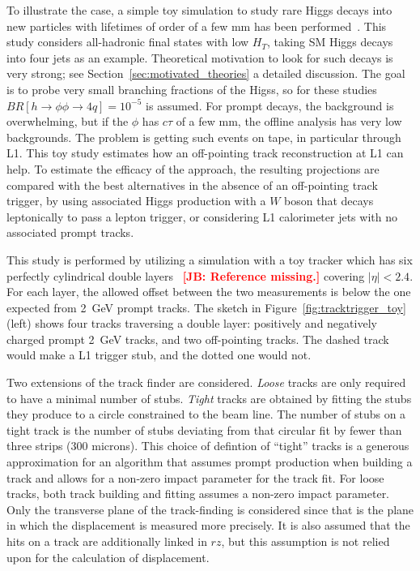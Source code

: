 To illustrate the case, a simple toy simulation to study rare Higgs decays into new particles with lifetimes of order of a few mm has been performed~\cite{Gershtein:2017tsv}. This study considers all-hadronic final states with low $H_T$, taking SM Higgs decays into four jets as an example. Theoretical motivation to look for such decays is very strong; see Section~\ref{sec:motivated_theories} a detailed discussion. The goal is to probe very small branching fractions of the Higss, so for these studies $BR[h\rightarrow\phi\phi\rightarrow 4q] = 10^{-5}$ is assumed. For prompt decays, the background is overwhelming, but if the $\phi$ has $c\tau$ of a few mm, the offline analysis has very low backgrounds. The problem is getting such events on tape, in particular through L1. This toy study estimates how an off-pointing track reconstruction at L1 can help. To estimate the efficacy of the approach, the resulting projections are compared with the best alternatives in the absence of an off-pointing track trigger, by using associated Higgs production with a $W$ boson that decays leptonically to pass a lepton trigger, or considering L1 calorimeter jets with no associated prompt tracks.

This study is performed by utilizing a simulation with a toy tracker which has six perfectly cylindrical double layers~\cite{geom} {\bf \textcolor{red}{[JB: Reference missing.]}} covering $|\eta|<2.4$. For each layer, the allowed offset between the two measurements is below the one expected from 2~GeV prompt tracks. The sketch in Figure~\ref{fig:tracktrigger_toy} (left) shows four tracks traversing a double layer: positively and negatively charged 
prompt 2~GeV tracks, and two off-pointing tracks. The dashed track would make a L1 trigger stub, and the dotted one would not.

Two extensions of the track finder are considered. {\it Loose} tracks are only required to have a minimal number of stubs. {\it Tight} tracks are obtained by fitting the stubs they produce to a circle constrained to the beam line. The number of stubs on a tight track is the number of stubs deviating from that circular fit by fewer than three strips (300 microns). This choice of defintion of ``tight'' tracks is a generous approximation for an algorithm that assumes prompt production when building a track and allows for a non-zero impact parameter for the track fit. For loose tracks, both track building and fitting assumes a non-zero impact parameter. Only the transverse plane of the track-finding is considered since that is the plane in which the displacement is measured more precisely. It is also assumed that the hits on a track are additionally linked in $rz$, but this assumption is not relied upon for the calculation of displacement. 

